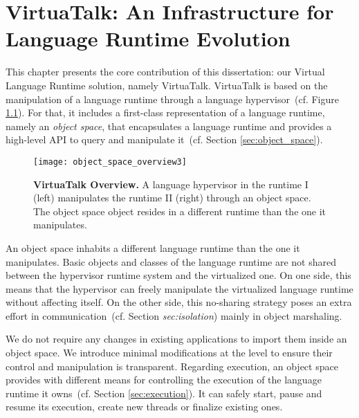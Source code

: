 

\chapter{VirtuaTalk: An Infrastructure for Language Runtime Evolution}
\minitoc
\introduction

This chapter presents the core contribution of this dissertation: our Virtual Language Runtime solution, namely VirtuaTalk. VirtuaTalk is based on the manipulation of a language runtime through a language hypervisor~(cf. Figure \ref{fig:objectSpaceOverview}). For that, it includes a first-class representation of a language runtime, namely an \emph{object space}, that encapsulates a language runtime and provides a high-level API to query and manipulate it~(cf. Section \ref{sec:object_space}).

\begin{figure}[htb]
\begin{center}
\texttt{[image: object\_space\_overview3]}
\caption{\textbf{VirtuaTalk Overview.} A language hypervisor in the runtime I (left) manipulates the runtime II (right) through an object space. The object space object resides in a different runtime than the one it manipulates.\label{fig:objectSpaceOverview}}
\end{center}
\end{figure}

An object space inhabits a different language runtime than the one it manipulates. Basic objects and classes of the language runtime are not shared between the hypervisor runtime system and the virtualized one. On one side, this means that the hypervisor can freely manipulate the virtualized language runtime without affecting itself. On the other side, this no-sharing strategy poses an extra effort in communication~(cf. Section \emph{sec:isolation}) mainly in object marshaling.

We do not require any changes in existing applications to import them inside an object space. We introduce minimal modifications at the \VM level to ensure their control and manipulation is transparent. Regarding execution, an object space provides with different means for controlling the execution of the language runtime it owns~(cf. Section \ref{sec:execution}). It can safely start, pause and resume its execution, create new threads or finalize existing ones.  


